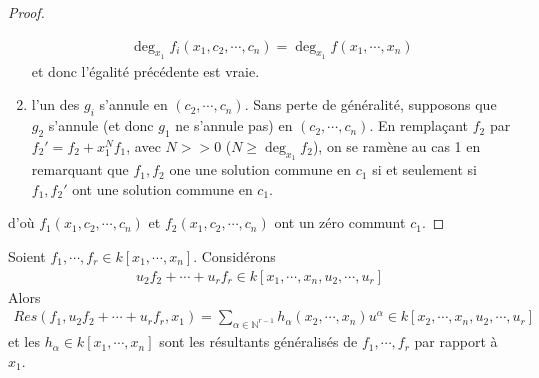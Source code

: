 \begin{proof}
\begin{enumerate}
                        \begin{align*}
                            \deg_{x_1} f_i(x_1, c_2, \cdots, c_n) = \deg_{x_1} f(x_1, \cdots, x_n)
                        \end{align*}
                        et donc l'égalité précédente est vraie.
                        \item l'un des $g_i$ s'annule en $(c_2, \cdots, c_n)$. Sans perte de généralité, supposons que $g_2$ s'annule (et donc $g_1$ ne s'annule pas) en $(c_2, \cdots, c_n)$. En remplaçant $f_2$ par $f_2' = f_2 + x_1^Nf_1$, avec $N >> 0$ ($N \geq \deg_{x_1}f_2$), on se ramène au cas 1 en remarquant que $f_1,f_2$ one une solution commune en $c_1$ si et seulement si $f_1, f_2'$ ont une solution commune en $c_1$.
                    \end{enumerate}
                    d'où $f_1(x_1, c_2, \cdots, c_n)$ et $f_2(x_1, c_2, \cdots, c_n)$ ont un zéro communt $c_1$.
                \end{proof}
                \begin{defi}
                    Soient $f_1, \cdots, f_r \in k[x_1, \cdots, x_n]$. Considérons 
                    \begin{align*}
                        u_2f_2 + \cdots + u_rf_r \in k[x_1, \cdots, x_n, u_2, \cdots, u_r]
                    \end{align*}
                    Alors
                    \begin{align*}
                        Res(f_1, u_2f_2 + \cdots + u_rf_r, x_1) = \sum_{\alpha \in \mathbb{N}^{r-1}} h_\alpha(x_2, \cdots, x_n) u^\alpha \in k[x_2, \cdots, x_n, u_2, \cdots, u_r]
                    \end{align*}
                    et les $h_\alpha \in k[x_1, \cdots, x_n]$ sont les résultants généralisés de $f_1, \cdots, f_r$ par rapport à $x_1$.
                \end{defi}
